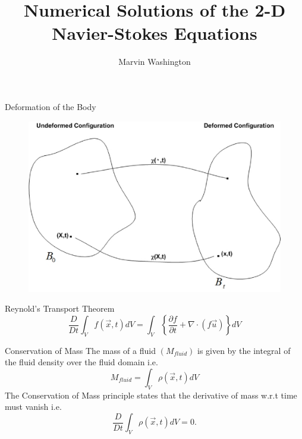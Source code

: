 \documentclass[frames]{prosper}
\title{Numerical Solutions of the 2-D Navier-Stokes Equations}
\author{Marvin Washington}
\begin{document}
\maketitle
\begin{slide}{Deformation of the Body}
\begin{figure}
\begin{center}
\includegraphics[scale = .3]{config_gragh_marvin.eps}
\end{center}
\end{figure}
\end{slide}

\begin{slide}[Dissolve]{Reynold's Transport Theorem}
$$\frac{D}{Dt} \int_{V} f(\stackrel{\rightarrow}{x},t)dV = \int_{V}\left\{ {\frac{\partial f}{\partial t} + \nabla\cdot(f\stackrel{\rightarrow}{u})}\right\}dV$$
\end{slide}

\begin{slide}[Dissolve]{Conservation of Mass}
The mass of a fluid $(M_{fluid})$ is given by the integral of the fluid density over the fluid domain i.e. \begin{equation} M_{fluid} = \int_{V} \rho(\stackrel{\rightarrow}{x},t)dV \end{equation}
The Conservation of Mass principle states that the derivative of mass w.r.t time must vanish i.e. \begin{equation} \frac{D}{Dt} \int_{V} \rho(\stackrel{\rightarrow}{x},t)dV = 0. \end{equation}
\end{slide}
\end{document}
